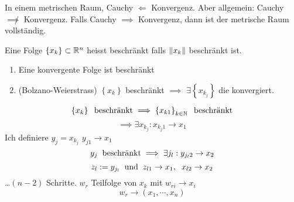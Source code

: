\begin{Bem}
  In einem metrischen Raum, Cauchy $\Leftarrow$ Konvergenz. Aber allgemein: Cauchy $\not\implies$ Konvergenz. Falls Cauchy $\implies$ Konvergenz, dann ist der metrische Raum vollständig.
\end{Bem}
\begin{Def}
  Eine Folge $\left\{ x_k \right\}\subset\mathbb{R}^n$ heisst beschränkt falls $\left\| x_k \right\|$ beschränkt ist.
\end{Def}
\begin{Sat}
  \begin{enumerate}
    \item Eine konvergente Folge ist beschränkt
    \item (Bolzano-Weierstrass) $\left\{ x_k \right\}$ beschränkt $\implies$ $\exists \left\{ x_{k_j} \right\}$ die konvergiert.
  \end{enumerate}
\end{Sat}
\begin{Bew}
  \[\left\{ x_k \right\}\hspace{2mm}\text{beschränkt}\implies \left\{ x_{k1} \right\}_{k\in\mathbb{N}}\hspace{2mm}\text{beschränkt}\]
  \[\implies \exists x_{k_j}: x_{k_j1}\to x_1\]
  Ich definiere $y_j=x_{k_j}$ $y_{j1}\to x_1$
  \[y_j\hspace{2mm}\text{beschränkt}\implies\exists j_l: y_{j_l2}\to x_2\]
  \[z_l:=y_{j_l}\hspace{2mm}\text{und}\hspace{2mm} z_{l1}\to x_1, \hspace{2mm} x_{l2}\to x_2\]
  \ldots $(n-2)$ Schritte. $w_r$ Teilfolge von $x_k$ mit $w_{ri}\to x_i$
  \[w_r\to(x_1,\cdots,x_n)\]
\end{Bew}
